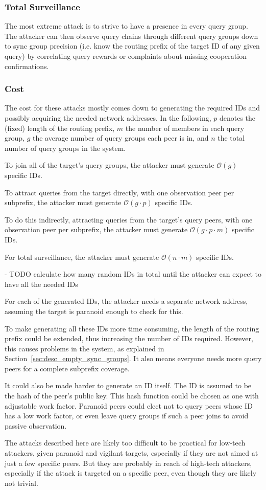 \subsubsection{Total Surveillance}
The most extreme attack is to strive to have a presence in every query group.
The attacker can then observe query chains through different query groups down
to sync group precision (i.e. know the routing prefix of the target ID of any
given query) by correlating query rewards or complaints about missing
cooperation confirmations.

\subsubsection{Cost}
The cost for these attacks mostly comes down to generating the required IDs and
possibly acquiring the needed network addresses. In the following, $p$ denotes
the (fixed) length of the routing prefix, $m$ the number of members in each
query group, $g$ the average number of query groups each peer is in, and $n$ the
total number of query groups in the system.

To join all of the target's query groups, the attacker must generate
$\mathcal{O}(g)$ specific IDs.

To attract queries from the target directly, with one observation peer per
subprefix, the attacker must generate $\mathcal{O}(g \cdot p)$ specific IDs.

To do this indirectly, attracting queries from the target's query peers, with
one observation peer per subprefix, the attacker must generate $\mathcal{O}(g
\cdot p \cdot m)$ specific IDs.

For total surveillance, the attacker must generate $\mathcal{O}(n \cdot m)$
specific IDs.

- TODO calculate how many random IDs in total until the attacker can expect to
  have all the needed IDs

For each of the generated IDs, the attacker needs a separate network address,
assuming the target is paranoid enough to check for this.

To make generating all these IDs more time consuming, the length of the routing
prefix could be extended, thus increasing the number of IDs required. However,
this causes problems in the system, as explained in
Section~\ref{sec:desc_empty_sync_groups}. It also means everyone needs more
query peers for a complete subprefix coverage.

It could also be made harder to generate an ID itself. The ID is assumed to be
the hash of the peer's public key. This hash function could be chosen as one
with adjustable work factor. Paranoid peers could elect not to query peers whose
ID has a low work factor, or even leave query groups if such a peer joins to
avoid passive observation.

The attacks described here are likely too difficult to be practical for low-tech
attackers, given paranoid and vigilant targets, especially if they are not aimed
at just a few specific peers. But they are probably in reach of high-tech
attackers, especially if the attack is targeted on a specific peer, even though
they are likely not trivial.
